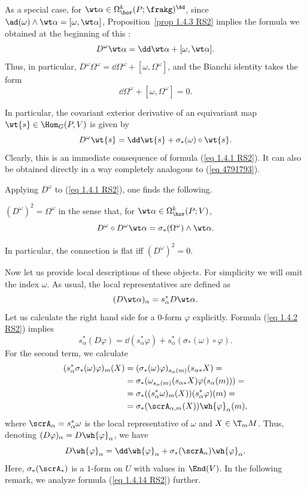 \begin{rem}
    As a special case, for $\wt\alpha\in\Omega^k_{\hor}(P;\frakg)^\Ad$, since $\ad(\omega)\wedge\wt\alpha=[\omega,\wt\alpha]$, Proposition~\ref{prop 1.4.3 RS2} implies the formula we obtained at the beginning of this \subsect:
    \[D^\omega\wt\alpha=\dd\wt\alpha+[\omega,\wt\alpha].\]
    Thus, in particular, $D^\omega\Omega^\omega=\dd\Omega^\omega+[\omega,\Omega^\omega]$, and the Bianchi identity takes the form
    \[\dd\Omega^\omega+[\omega,\Omega^\omega]=0.\label{eq 1.4.11 RS2 Bianchi}\]
\end{rem}


\begin{rem}\label{rem 1.4.4 RS2}
    In particular, the covariant exterior derivative of an equivariant map $\wt{s}\in\Hom_G(P,V)$ is given by
    \[D^\omega\wt{s}=\dd\wt{s}+\sigma_\ast(\omega)\circ \wt{s}.\label{eq 1.4.2 RS2}\]
    Clearly, this is an immediate consequence of formula (\ref{eq 1.4.1 RS2}). It can also be obtained directly in a way completely analogous to (\ref{eq 4791793}).
\end{rem}

Applying $D^\omega$ to (\ref{eq 1.4.1 RS2}), one finds the following.

\begin{prop}[{{\cite[Prop.~1.4.13]{RS2}}}] \label{prop 1.4.13 RS2}
    $(D^\omega)^2=\Omega^\omega$ in the sense that, for $\wt\alpha\in \Omega^k_{\hor}(P;V)$,
    \[D^\omega\circ D^\omega\wt\alpha=\sigma_\ast(\Omega^\omega)\wedge\wt\alpha.\]
\end{prop}
In particular, the connection is flat iff $(D^\omega)^2=0$.

Now let us provide local descriptions of these objects. For simplicity we will omit the index $\omega$. As usual, the local representatives are defined as
\[(D\wt\alpha)_\alpha=s_\alpha^\ast D\wt\alpha.\]
Let us calculate the right hand side for a $0$-form $\varphi$ explicitly. Formula (\ref{eq 1.4.2 RS2}) implies
\[s_\alpha^\ast(D\varphi)=\dd(s_\alpha^\ast\varphi)+s_\alpha^\ast(\sigma_\ast(\omega)\circ\varphi).\]
For the second term, we calculate
\begin{align}
    (s_\alpha^\ast\sigma_\ast(\omega)\varphi)_m(X)&=(\sigma_\ast(\omega)\varphi)_{s_\alpha(m)}(s_{\alpha\ast}X)=\\
    &=\sigma_\ast(\omega_{s_\alpha(m)}(s_{\alpha\ast}X)\varphi(s_\alpha(m)))=\\
    &=\sigma_\ast((s_\alpha^\ast\omega)_m(X))(s_\alpha^\ast\varphi)(m)=\\
    &=\sigma_\ast(\scrA_{\alpha,m}(X))\wh{\varphi}_\alpha(m),
\end{align}
where $\scrA_\alpha=s_\alpha^\ast\omega$ is the local representative of $\omega$ and $X\in \T_mM$. Thus, denoting $(D\varphi)_\alpha=D\wh{\varphi}_\alpha$, we have
\[D\wh{\varphi}_\alpha=\dd\wh{\varphi}_\alpha+\sigma_\ast(\scrA_\alpha)\wh{\varphi}_\alpha.\label{eq 1.4.14 RS2}\]
Here, $\sigma_\ast(\scrA_\ast)$ is a $1$-form on $U$ with values in $\End(V)$. In the following remark, we analyze formula (\ref{eq 1.4.14 RS2}) further.

